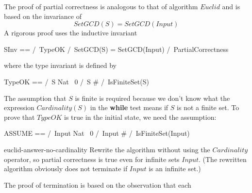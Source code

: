 \documentclass[fleqn,leqno]{article}
\begin{document}
The proof of partial correctness is analogous to that of 
algorithm $Euclid$ and is based on the invariance of
 \[ SetGCD(S) = SetGCD(Input) \]
A rigorous proof uses the inductive invariant
\begin{display}
\begin{notla}
SInv == /\ TypeOK
        /\ SetGCD(S) = SetGCD(Input)
        /\ PartialCorrectness
\end{notla}
\begin{tlatex}
%
%
%
\end{tlatex}
\end{display}
where the type invariant is defined by
\begin{display}
\begin{notla}
TypeOK == /\ S \subseteq Nat \ {0}
          /\ S # {} 
          /\ IsFiniteSet(S)
\end{notla}
\begin{tlatex}
%
%
\end{tlatex}
\end{display}
The assumption that $S$ is finite is required because we don't know
what the expression $Cardinality(S)$ in the \textbf{while} test means
if $S$ is not a finite set.  To prove that $TypeOK$ is true in the
initial state, we need the assumption:
\begin{display}
\begin{notla}
ASSUME == /\ Input \subseteq Nat \ {0}
          /\ Input # {}
          /\ IsFiniteSet(Input)
\end{notla}
\begin{tlatex}
%
%
\end{tlatex}
\end{display}
\begin{aquestion}{euclid-answer-no-cardinality}
Rewrite the algorithm without using the $Cardinality$ operator, so
partial correctness is true even for infinite sets $Input$.  (The
rewritten algorithm obviously does not terminate if $Input$ is an
infinite set.)
\end{aquestion}
%
The proof of termination is based on the observation that each
\end{document}
